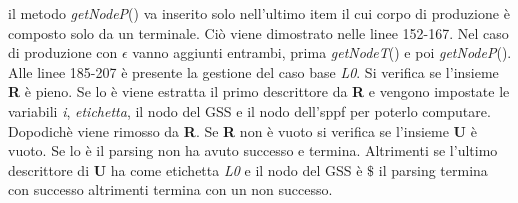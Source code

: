 il metodo \textit{getNodeP}() va inserito solo nell'ultimo item il cui corpo di produzione è composto solo da un terminale. Ciò viene dimostrato nelle linee 152-167. Nel caso di produzione con $\epsilon$ vanno aggiunti entrambi, prima \textit{getNodeT}() e poi \textit{getNodeP}(). Alle linee 185-207 è presente la gestione del caso base \textit{L0}. Si verifica se l'insieme \textbf{R} è pieno. Se lo è viene estratta il primo descrittore da \textbf{R} e vengono impostate le variabili \textit{i}, \textit{etichetta}, il nodo del GSS e il nodo dell'sppf per poterlo computare. Dopodichè viene rimosso da \textbf{R}. Se \textbf{R} non è vuoto si verifica se l'insieme \textbf{U} è vuoto. Se lo è il parsing non ha avuto successo e termina. Altrimenti se l'ultimo descrittore di \textbf{U} ha come etichetta \textit{L0} e il nodo del GSS è $\$$ il parsing termina con successo altrimenti termina con un non successo.